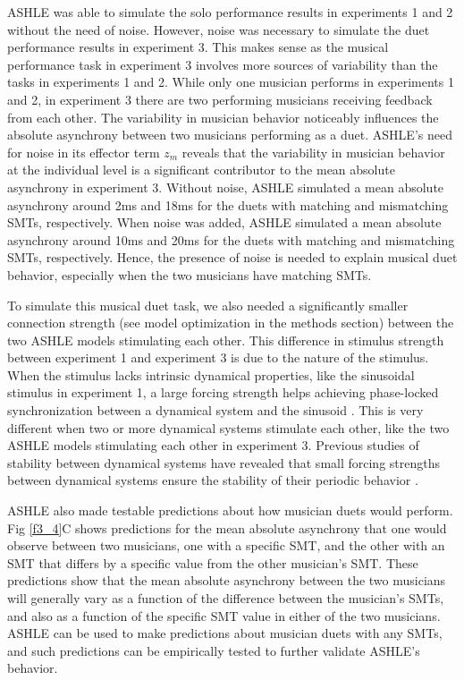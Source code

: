 \documentclass{report}
\begin{document}
ASHLE was able to simulate the solo performance results in experiments 1 and 2 without the need of noise. However, noise was necessary to simulate the duet performance results in experiment 3. This makes sense as the musical performance task in experiment 3 involves more sources of variability than the tasks in experiments 1 and 2. While only one musician performs in experiments 1 and 2, in experiment 3 there are two performing musicians receiving feedback from each other. The variability in musician behavior noticeably influences the absolute asynchrony between two musicians performing as a duet. ASHLE's need for noise in its effector term $z_m$ reveals that the variability in musician behavior at the individual level is a significant contributor to the mean absolute asynchrony in experiment 3. Without noise, ASHLE simulated a mean absolute asynchrony around 2ms and 18ms for the duets with matching and mismatching SMTs, respectively. When noise was added, ASHLE simulated a mean absolute asynchrony around 10ms and 20ms for the duets with matching and mismatching SMTs, respectively. Hence, the presence of noise is needed to explain musical duet behavior, especially when the two musicians have matching SMTs.

To simulate this musical duet task, we also needed a significantly smaller connection strength (see model optimization in the methods section) between the two ASHLE models stimulating each other. This difference in stimulus strength between experiment 1 and experiment 3 is due to the nature of the stimulus. When the stimulus lacks intrinsic dynamical properties, like the sinusoidal stimulus in experiment 1, a large forcing strength helps achieving phase-locked synchronization between a dynamical system and the sinusoid \cite{kim2015signal}. This is very different when two or more dynamical systems stimulate each other, like the two ASHLE models stimulating each other in experiment 3. Previous studies of stability between dynamical systems have revealed that small forcing strengths between dynamical systems ensure the stability of their periodic behavior \cite{kim2015signal}.

ASHLE also made testable predictions about how musician duets would perform. Fig \ref{f3_4}C shows predictions for the mean absolute asynchrony that one would observe between two musicians, one with a specific SMT, and the other with an SMT that differs by a specific value from the other musician's SMT. These predictions show that the mean absolute asynchrony between the two musicians will generally vary as a function of the difference between the musician's SMTs, and also as a function of the specific SMT value in either of the two musicians. ASHLE can be used to make predictions about musician duets with any SMTs, and such predictions can be empirically tested to further validate ASHLE's behavior.
\end{document}
